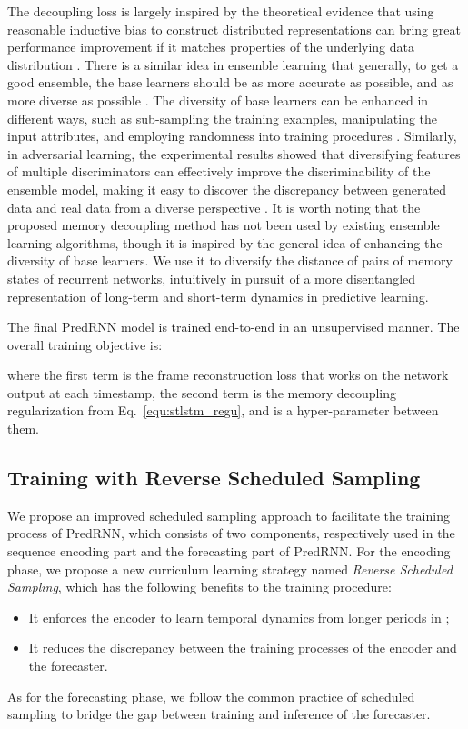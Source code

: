 \documentclass[10pt,journal,compsoc]{IEEEtran}
\newcommand{\eqn}[1]{Eq.~\eqref{#1}}
\begin{document}
The decoupling loss is largely inspired by the theoretical evidence that using reasonable inductive bias to construct distributed representations can bring great performance improvement if it matches properties of the underlying data distribution \cite{pascanu2013number}.
There is a similar idea in ensemble learning that generally, to get a good ensemble, the base learners should be as more accurate as possible, and as more diverse as possible \cite{krogh1995neural}. 
The diversity of base learners can be enhanced in different ways, such as sub-sampling the training examples, manipulating the input attributes, and employing randomness into training procedures \cite{zhou2009ensemble}. 
Similarly, in adversarial learning, the experimental results showed that diversifying features of multiple discriminators can effectively improve the discriminability of the ensemble model, making it easy to discover the discrepancy between generated data and real data from a diverse perspective \cite{jin2020multi}. 
It is worth noting that the proposed memory decoupling method has not been used by existing ensemble learning algorithms, though it is inspired by the general idea of enhancing the diversity of base learners. 
We use it to diversify the distance of pairs of memory states of recurrent networks, intuitively in pursuit of a more disentangled representation of long-term and short-term dynamics in predictive learning. 

The final PredRNN model is trained end-to-end in an unsupervised manner. The overall training objective is:
 
where the first term is the frame reconstruction loss that works on the network output at each timestamp, the second term is the memory decoupling regularization from \eqn{equ:stlstm_regu}, and  is a hyper-parameter between them.



\subsection{Training with Reverse Scheduled Sampling}
\label{method_curri}


We propose an improved scheduled sampling approach to facilitate the training process of PredRNN, which consists of two components, respectively used in the sequence encoding part and the forecasting part of PredRNN.
For the encoding phase, we propose a new curriculum learning strategy named \emph{Reverse Scheduled Sampling}, which has the following benefits to the training procedure: 
\begin{itemize}
    \item It enforces the encoder to learn temporal dynamics from longer periods in ;
    \item It reduces the discrepancy between the training processes of the encoder and the forecaster.
\end{itemize}
As for the forecasting phase, we follow the common practice of scheduled sampling \cite{bengio2015scheduled} to bridge the gap between training and inference of the forecaster. 
\end{document}
